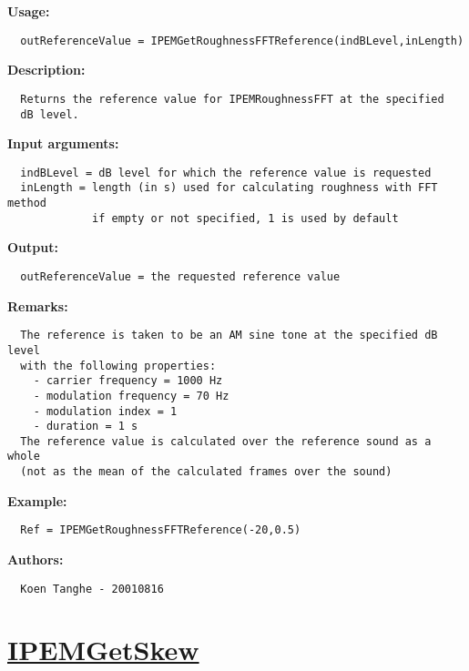 \textbf{Usage:}
\begin{verbatim}  outReferenceValue = IPEMGetRoughnessFFTReference(indBLevel,inLength)

\end{verbatim}
\textbf{Description:}
\begin{verbatim}  Returns the reference value for IPEMRoughnessFFT at the specified
  dB level.

\end{verbatim}
\textbf{Input arguments:}
\begin{verbatim}  indBLevel = dB level for which the reference value is requested
  inLength = length (in s) used for calculating roughness with FFT method
             if empty or not specified, 1 is used by default

\end{verbatim}
\textbf{Output:}
\begin{verbatim}  outReferenceValue = the requested reference value

\end{verbatim}
\textbf{Remarks:}
\begin{verbatim}  The reference is taken to be an AM sine tone at the specified dB level
  with the following properties:
    - carrier frequency = 1000 Hz
    - modulation frequency = 70 Hz
    - modulation index = 1
    - duration = 1 s
  The reference value is calculated over the reference sound as a whole
  (not as the mean of the calculated frames over the sound)

\end{verbatim}
\textbf{Example:}
\begin{verbatim}  Ref = IPEMGetRoughnessFFTReference(-20,0.5)

\end{verbatim}
\textbf{Authors:}
\begin{verbatim}  Koen Tanghe - 20010816
\end{verbatim}


\newpage
\section*{\hyperlink{Concepts:IPEMGetSkew}{IPEMGetSkew}}
\hypertarget{FuncRef:IPEMGetSkew}{}

